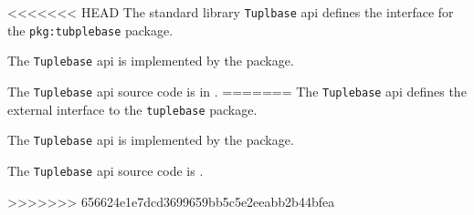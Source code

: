 
<<<<<<< HEAD
The standard library {\tt Tuplbase} api defines the interface for the {\tt pkg:tubplebase} package.

The {\tt Tuplebase} api is implemented by the 
 package.

The {\tt Tuplebase} api source code is in .
=======
The {\tt Tuplebase} api defines the external interface to the {\tt tuplebase} package.

The {\tt Tuplebase} api is implemented by the  package.

The {\tt Tuplebase} api source code is .


>>>>>>> 656624e1e7dcd3699659bb5c5e2eeabb2b44bfea

